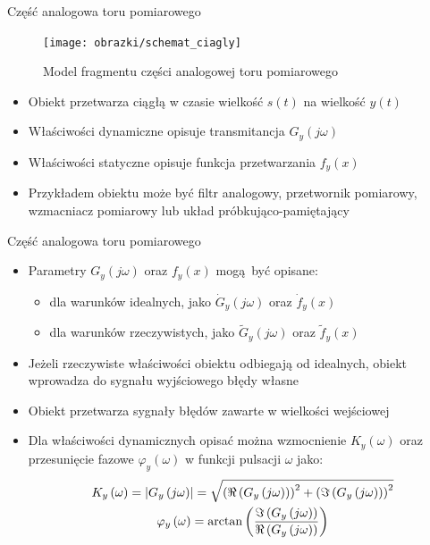\documentclass[12pt, polish, aspectratio = 169]{beamer}
\begin{document}
\begin{frame}{Część analogowa toru pomiarowego}
\begin{figure}
\texttt{[image: obrazki/schemat\_ciagly]}
\caption{Model fragmentu części analogowej toru pomiarowego}
\end{figure}
\begin{itemize}
\item Obiekt przetwarza ciągłą w czasie wielkość $s(t)$ na wielkość $y(t)$
\item Właściwości dynamiczne opisuje transmitancja $G_{y}(j\omega)$
\item Właściwości statyczne opisuje funkcja przetwarzania $f_{y}(x)$
\item Przykładem obiektu może być filtr analogowy, przetwornik pomiarowy, wzmacniacz pomiarowy lub układ próbkująco-pamiętający
\end{itemize}
\end{frame}

\begin{frame}{Część analogowa toru pomiarowego}
\begin{itemize}
\item Parametry $G_{y}(j\omega)$ oraz $f_{y}(x)$ mogą być opisane:
	\begin{itemize}
	\item dla warunków idealnych, jako $\dot{G}_{y}(j\omega)$ oraz $\dot{f}_{y}(x)$
	\item dla warunków rzeczywistych, jako $\tilde{G}_{y}(j\omega)$ oraz $\tilde{f}_{y}(x)$
	\end{itemize}
\item Jeżeli rzeczywiste właściwości obiektu odbiegają od idealnych, obiekt wprowadza do sygnału wyjściowego błędy własne
\item Obiekt przetwarza sygnały błędów zawarte w wielkości wejściowej
\item Dla właściwości dynamicznych opisać można wzmocnienie $K_{y}(\omega)$ oraz przesunięcie fazowe $\varphi_{y}(\omega)$ w funkcji pulsacji $\omega$ jako:
\begin{gather}
K_{y} \left(\omega\right) = \left| G_{y} \left(j\omega\right) \right| =
	\sqrt{\left( \Re \left( G_{y} \left(j\omega\right) \right) \right)^{2} +
	\left( \Im \left( G_{y} \left(j\omega\right) \right) \right)^{2}}
\label{eq:mid_cont_amp} \\
\varphi_{y} \left(\omega\right) = \arctan \left( \frac{\Im \left( G_{y} \left(j\omega\right) \right)}{\Re \left( G_{y} \left(j\omega\right) \right)} \right) \label{eq:mid_cont_phi}
\end{gather}
\end{itemize}
\end{frame}
\end{document}
